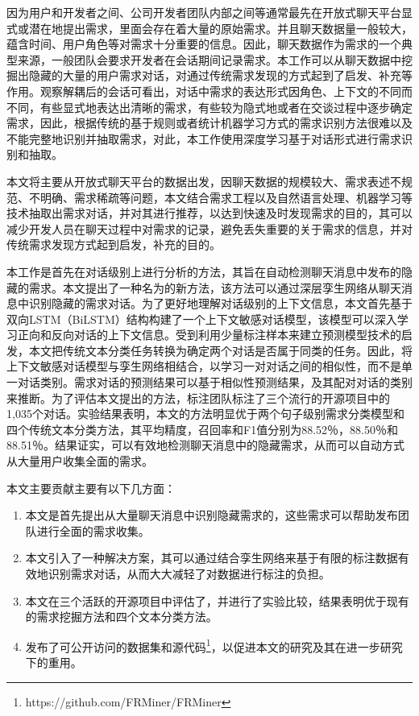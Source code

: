 因为用户和开发者之间、公司开发者团队内部之间等通常最先在开放式聊天平台显式或潜在地提出需求，里面会存在着大量的原始需求。并且聊天数据量一般较大，蕴含时间、用户角色等对需求十分重要的信息。因此，聊天数据作为需求的一个典型来源，一般团队会要求开发者在会话期间记录需求。本工作可以从聊天数据中挖掘出隐藏的大量的用户需求对话，对通过传统需求发现的方式起到了启发、补充等作用。观察解耦后的会话可看出，对话中需求的表达形式因角色、上下文的不同而不同，有些显式地表达出清晰的需求，有些较为隐式地或者在交谈过程中逐步确定需求，因此，根据传统的基于规则或者统计机器学习方式的需求识别方法很难以及不能完整地识别并抽取需求，对此，本工作使用深度学习基于对话形式进行需求识别和抽取。


本文将主要从开放式聊天平台的数据出发，因聊天数据的规模较大、需求表述不规范、不明确、需求稀疏等问题，本文结合需求工程以及自然语言处理、机器学习等技术抽取出需求对话，并对其进行推荐，以达到快速及时发现需求的目的，其可以减少开发人员在聊天过程中对需求的记录，避免丢失重要的关于需求的信息，并对传统需求发现方式起到启发，补充的目的。

本工作是首先在对话级别上进行分析的方法，其旨在自动检测聊天消息中发布的隐藏的需求。本文提出了一种名为{\tool}的新方法，该方法可以通过深层孪生网络从聊天消息中识别隐藏的需求对话。为了更好地理解对话级别的上下文信息，本文首先基于双向LSTM（BiLSTM）结构构建了一个上下文敏感对话模型{\dm}，该模型可以深入学习正向和反向对话的上下文信息。受到利用少量标注样本来建立预测模型技术的启发，本文把传统文本分类任务转换为确定两个对话是否属于同类的任务。因此，{\tool}将上下文敏感对话模型与孪生网络相结合，以学习一对对话之间的相似性，而不是单一对话类别。需求对话的预测结果可以基于相似性预测结果，及其配对对话的类别来推断。为了评估本文提出的方法，标注团队标注了三个流行的开源项目中的1,035个对话。实验结果表明，本文的方法明显优于两个句子级别需求分类模型和四个传统文本分类方法，其平均精度，召回率和F1值分别为88.52％，88.50％和88.51％。结果证实，{\tool}可以有效地检测聊天消息中的隐藏需求，从而可以自动方式从大量用户收集全面的需求。

本文主要贡献主要有以下几方面：
\begin{enumerate}
    \item  本文是首先提出从大量聊天消息中识别隐藏需求的，这些需求可以帮助发布团队进行全面的需求收集。
    \item 本文引入了一种解决方案，其可以通过结合孪生网络来基于有限的标注数据有效地识别需求对话，从而大大减轻了对数据进行标注的负担。
    \item 本文在三个活跃的开源项目中评估了{\tool}，并进行了实验比较，结果表明{\tool}优于现有的需求挖掘方法和四个文本分类方法。
    \item 发布了可公开访问的数据集和源代码\footnote{https://github.com/FRMiner/FRMiner}，以促进本文的研究及其在进一步研究下的重用。
\end{enumerate}



